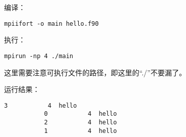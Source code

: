 编译：
\begin{Verbatim}[]
mpiifort -o main hello.f90
\end{Verbatim}

执行：
\begin{Verbatim}[]
mpirun -np 4 ./main
\end{Verbatim}
\noindent 这里需要注意可执行文件的路径，即这里的“./”不要漏了。

运行结果：
\begin{Verbatim}[]
           3           4  hello
           0           4  hello
           2           4  hello
           1           4  hello
\end{Verbatim}
